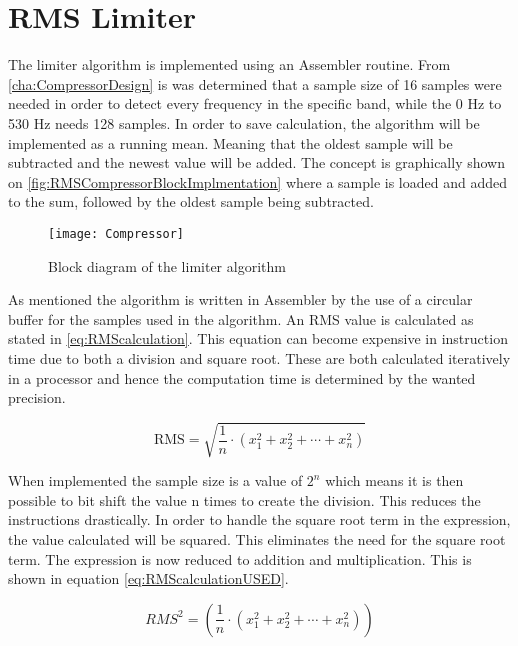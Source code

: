 \chapter{RMS Limiter}

The limiter algorithm is implemented using an Assembler routine. From \autoref{cha:CompressorDesign} is was determined that a sample size of 16 samples were needed in order to detect every frequency in the specific band, while the 0 Hz to 530 Hz needs 128 samples. In order to save calculation, the algorithm will be implemented as a running mean. Meaning that the oldest sample will be subtracted and the newest value will be added. The concept is graphically shown on \autoref{fig:RMSCompressorBlockImplmentation} where a sample is loaded and added to the sum, followed by the oldest sample being subtracted.


\begin{figure}[H]
    \centering
\texttt{[image: Compressor]}
    \caption{Block diagram of the limiter algorithm}
    \label{fig:RMSCompressorBlockImplmentation}
\end{figure}

As mentioned the algorithm is written in Assembler by the use of a circular buffer for the samples used in the algorithm. %
An RMS value is calculated as stated in \autoref{eq:RMScalculation}. This equation can become expensive in instruction time due to both a division and square root. These are both calculated iteratively in a processor and hence the computation time is determined by the wanted precision.

\begin{equation}\label{eq:RMScalculation}
\text{RMS}=\sqrt{\frac{1}{n}\cdot(x_1^2+x_2^2+\cdots+x_n^2)}
\end{equation}

When implemented the sample size is a value of $2^n$ which means it is then possible to bit shift the value n times to create the division. This reduces the instructions drastically. In order to handle the square root term in the expression, the value calculated will be squared. This eliminates the need for the square root term. The expression is now reduced to addition and multiplication. This is shown in equation \ref{eq:RMScalculationUSED}.

\begin{equation}\label{eq:RMScalculationUSED}
RMS^2=(\frac{1}{n}\cdot(x_1^2+x_2^2+\cdots+x_n^2))
\end{equation}

